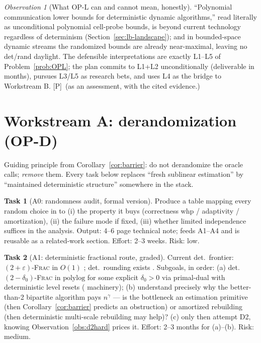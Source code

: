 \documentclass[11pt]{article}
\theoremstyle{definition}
\newtheorem{task}{Task}
\theoremstyle{remark}
\newtheorem{observation}[theorem]{Observation}
\newcommand{\statusP}{\textcolor{blue!60!black}{\textsf{[P]}}}
\newcommand{\polylog}{\mathrm{polylog}}
\newcommand{\eps}{\varepsilon}
\begin{document}
\begin{observation}[What OP-L can and cannot mean, honestly]
\label{obs:honest}
``Polynomial communication lower bounds for deterministic dynamic
algorithms,'' read literally as unconditional polynomial cell-probe
bounds, is beyond current technology regardless of determinism
(Section~\ref{sec:lb-landscape}); and in bounded-space dynamic streams
the randomized bounds \cite{AKLY16} are already near-maximal, leaving no
det/rand daylight. The defensible interpretations are exactly
L1--L5 of Problem~\ref{prob:OPL}; the plan commits to L1+L2
unconditionally (deliverable in months), pursues L3/L5 as research
bets, and uses L4 as the bridge to Workstream B. \statusP\ (as an
assessment, with the cited evidence.)
\end{observation}

\section{Workstream A: derandomization (OP-D)}
\label{sec:wsA}

Guiding principle from Corollary~\ref{cor:barrier}: do not derandomize
the oracle calls; \emph{remove} them. Every task below replaces
``fresh sublinear estimation'' by ``maintained deterministic structure''
somewhere in the stack.

\begin{task}[A0: randomness audit, formal version]\label{task:audit}
Produce a table mapping every random choice in
\cite{BKSW23,Beh23,ABR24,BG24,AKK25} to (i) the property it buys
(correctness whp / adaptivity / amortization), (ii) the failure mode if
fixed, (iii) whether limited independence suffices in the analysis.
Output: 4--6 page technical note; feeds A1--A4 and is reusable as a
related-work section. Effort: 2--3 weeks. Risk: low.
\end{task}

\begin{task}[A1: deterministic fractional route, graded]\label{task:frac}
Current det.\ frontier: $(2+\eps)$-\textsc{Frac} in $O(1)$ \cite{BCH17};
det.\ rounding exists \cite{BK21}. Subgoals, in order:
(a) det.\ $(2-\delta_0)$-\textsc{Frac} in $\polylog$ for some explicit
$\delta_0>0$ via primal-dual with deterministic level resets
(\cite{BHI15,BHN16} machinery);
(b) understand precisely why the \cite{BHN16} better-than-2 bipartite
algorithm pays $n^{\gamma}$ --- is the bottleneck an estimation
primitive (then Corollary~\ref{cor:barrier} predicts an obstruction) or
amortized rebuilding (then deterministic multi-scale rebuilding may
help)?
(c) only then attempt D2, knowing Observation~\ref{obs:d2hard} prices
it. Effort: 2--3 months for (a)--(b). Risk: medium.
\end{task}
\end{document}
